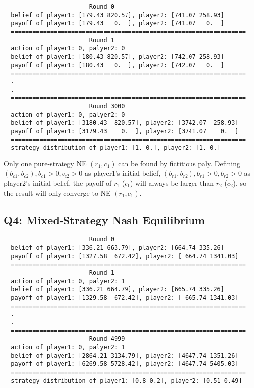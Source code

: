 \documentclass[a4paper, oneside, final, 12pt]{scrartcl} %
\begin{document}
\begin{lstlisting}
                        Round 0
  belief of player1: [179.43 820.57], player2: [741.07 258.93]
  payoff of player1: [179.43   0.  ], player2: [741.07   0.  ]
  ==================================================================
                        Round 1
  action of player1: 0, palyer2: 0
  belief of player1: [180.43 820.57], player2: [742.07 258.93]
  payoff of player1: [180.43   0.  ], player2: [742.07   0.  ]
  ==================================================================
  .
  .
  ==================================================================
                        Round 3000
  action of player1: 0, palyer2: 0
  belief of player1: [3180.43  820.57], player2: [3742.07  258.93]
  payoff of player1: [3179.43    0.  ], player2: [3741.07    0.  ]
  ==================================================================
  strategy distribution of player1: [1. 0.], player2: [1. 0.]
\end{lstlisting}

\begingroup
\raggedright
Only one pure-strategy NE $(r_1, c_1)$ can be found by fictitious paly.
Defining $(b_{c1}, b_{c2}), b_{c1} > 0,  b_{c2} > 0$ as player1's initial belief,
$(b_{r1}, b_{r2}), b_{r1} > 0,  b_{r2} > 0$ as player2's initial belief,
the payoff of $r_1$ ($c_1$) will always be larger than $r_2$ ($c_2$),
so the result will only converge to NE $(r_1, c_1)$.
\endgroup

\newpage

\subsection{Q4: Mixed-Strategy Nash Equilibrium}

\begin{lstlisting}
                        Round 0
  belief of player1: [336.21 663.79], player2: [664.74 335.26]
  payoff of player1: [1327.58  672.42], player2: [ 664.74 1341.03]
  ==================================================================
                        Round 1
  action of player1: 0, palyer2: 1
  belief of player1: [336.21 664.79], player2: [665.74 335.26]
  payoff of player1: [1329.58  672.42], player2: [ 665.74 1341.03]
  ==================================================================
  .
  .
  ==================================================================
                        Round 4999
  action of player1: 0, palyer2: 1
  belief of player1: [2864.21 3134.79], player2: [4647.74 1351.26]
  payoff of player1: [6269.58 5728.42], player2: [4647.74 5405.03]
  ==================================================================
  strategy distribution of player1: [0.8 0.2], player2: [0.51 0.49]
\end{lstlisting}
\end{document}
